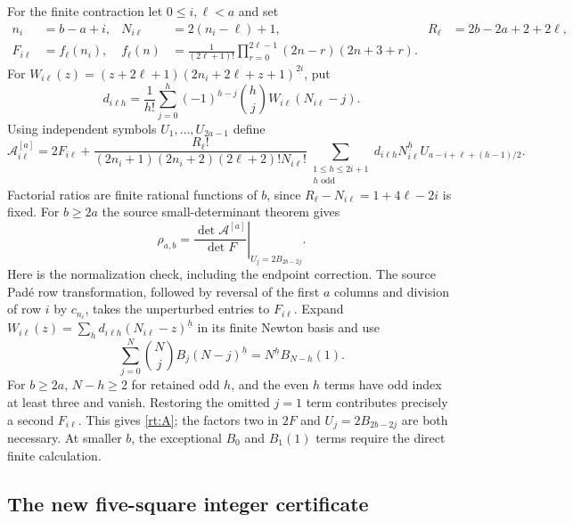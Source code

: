 \documentclass[11pt,a4paper]{article}
\numberwithin{equation}{section}
\theoremstyle{definition}
\theoremstyle{remark}
\begin{document}
For the finite contraction let $0\le i,\ell<a$ and set
\begin{align*}
 n_i&=b-a+i,&N_{i\ell}&=2(n_i-\ell)+1,&R_\ell&=2b-2a+2+2\ell,\\
 F_{i\ell}&=f_\ell(n_i),&
 f_\ell(n)&=\frac1{(2\ell+1)!}
     \prod_{r=0}^{2\ell-1}(2n-r)(2n+3+r).
\end{align*}
For $W_{i\ell}(z)=(z+2\ell+1)
 (2n_i+2\ell+z+1)^{\underline{2i}}$, put
\[
 d_{i\ell h}=\frac1{h!}\sum_{j=0}^h
            (-1)^{h-j}\binom hj W_{i\ell}(N_{i\ell}-j).
\]
Using independent symbols $U_1,\ldots,U_{2a-1}$ define
\begin{equation}\label{rt:A}
 \mathcal A^{[a]}_{i\ell}
 =2F_{i\ell}+
 \frac{R_\ell!}
 {(2n_i+1)(2n_i+2)(2\ell+2)!N_{i\ell}!}
 \sum_{\substack{1\le h\le2i+1\\h\text{ odd}}}
 d_{i\ell h}N_{i\ell}^{\underline h}
 U_{a-i+\ell+(h-1)/2}.
\end{equation}
Factorial ratios are finite rational functions of $b$, since
$R_\ell-N_{i\ell}=1+4\ell-2i$ is fixed. For $b\ge2a$ the source
small-determinant theorem gives
\begin{equation}\label{rt:ratio}
 \rho_{a,b}=
 \left.\frac{\det\mathcal A^{[a]}}{\det F}
                    \right|_{U_j=2B_{2b-2j}}.
\end{equation}
Here is the normalization check, including the endpoint correction.
The source Pad\'e row transformation, followed by reversal of the
first $a$ columns and division of row $i$ by $c_{n_i}$, takes the
unperturbed entries to $F_{i\ell}$. Expand
$W_{i\ell}(z)=\sum_h d_{i\ell h}(N_{i\ell}-z)^{\underline h}$
in its finite Newton basis and use
\[
 \sum_{j=0}^N\binom Nj B_j(N-j)^{\underline h}
     =N^{\underline h}B_{N-h}(1).
\]
For $b\ge2a$, $N-h\ge2$ for retained odd $h$, and the even $h$
terms have odd index at least three and vanish. Restoring the
omitted $j=1$ term contributes precisely a second $F_{i\ell}$.
This gives \eqref{rt:A}; the factors two in $2F$ and
$U_j=2B_{2b-2j}$ are both necessary. At smaller $b$, the exceptional
$B_0$ and $B_1(1)$ terms require the direct finite calculation.

\subsection{The new five-square integer certificate}
\end{document}

